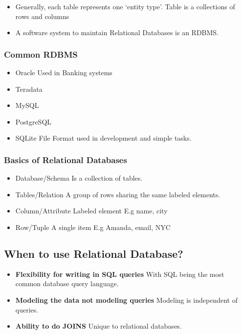 \documentclass[
	paper=a4,%
	pagesize,%
	8pt, fleqn,%
	headings=small,%
	notitlepage,%
	parskip=never]%
	{scrreprt}
\begin{document}
\begin{multicols*}{3}
\begin{itemize}
\item Generally, each table represents one ‘entity type’. Table is a collections of rows and columns

\item A software system to maintain Relational Databases is an RDBMS.
\end{itemize}


\subsubsection{Common RDBMS}
\begin{itemize}
\item Oracle \hfill Used in Banking systems
\item Teradata
\item MySQL
\item PostgreSQL 
\item SQLite \hfill File Format used in development and simple tasks.
\end{itemize}

\subsubsection{Basics of Relational Databases}
\begin{itemize}
\item Database/Schema \hfill Is a collection of tables.
\item Tables/Relation \hfill A group of rows sharing the same labeled elements.
\item Column/Attribute \hfill Labeled element E.g name, city
\item Row/Tuple \hfill A single item E.g Amanda, email, NYC
\end{itemize}
\subsection{When to use Relational Database?}

\begin{itemize}
\item \textbf{Flexibility for writing in SQL queries} With SQL being the most common database query language.

\item \textbf{Modeling the data not modeling queries} Modeling is independent of queries.

\item \textbf{Ability to do JOINS} Unique to relational databases. 


\end{itemize}
\end{multicols*}
\end{document}
